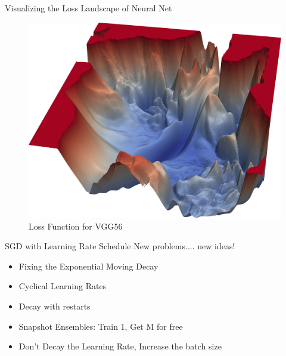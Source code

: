 \documentclass[xcolor=pdftex,dvipsnames,table,mathserif]{beamer}
\begin{document}
\begin{frame}{Visualizing the Loss Landscape of Neural Net}
\begin{figure}
\includegraphics[width=.5\columnwidth]{../graphics/VGG56Loss}
\caption{Loss Function for VGG56 \cite{li2017visualizing}}
\end{figure}
\end{frame}


\begin{frame}{SGD with Learning Rate Schedule}
New problems.... new ideas!
\begin{itemize}
\item Fixing the Exponential Moving Decay \cite{dozat2016deep}
\item Cyclical Learning Rates \cite{smith2017cyclical}
\item Decay with restarts  \cite{loshchilov2016sgdr}
\item Snapshot Ensembles: Train 1, Get M for free \cite{huang2017snapshot}
\item Don't Decay the Learning Rate, Increase the batch size \cite{smith2018don}
\end{itemize}
\end{frame}
\end{document}

